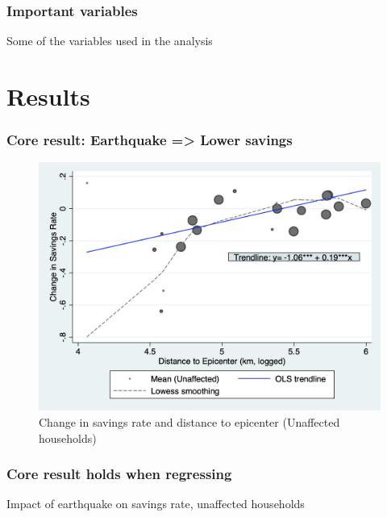 \documentclass[aspectratio=169]{beamer}
\begin{document}
\begin{frame}
	\frametitle{Important variables}
	\vspace{0.6}
	\begin{table}
		\centering
		\caption{\label{tab:sumstats} \small{Some of the variables used in the analysis} }
		\small
		
	\end{table}
\end{frame}	

\section*{Results}
\begin{frame}
	\frametitle{\Large{Core result: Earthquake => Lower savings}}
	\begin{figure}
	    \caption{\small{Change in savings rate and distance to epicenter (Unaffected households)}}
	    \includegraphics[scale=0.35]{pics/incomecons_plot_RAR2draft} 
	\end{figure}
\end{frame}


\begin{frame}
	\frametitle{Core result holds when regressing}
	\begin{table}[p]
		\centering
		\caption{\label{tab:reg1} \small{Impact of earthquake on savings rate, unaffected households}}
		\small
		
	\end{table}
\end{frame}
\end{document}
